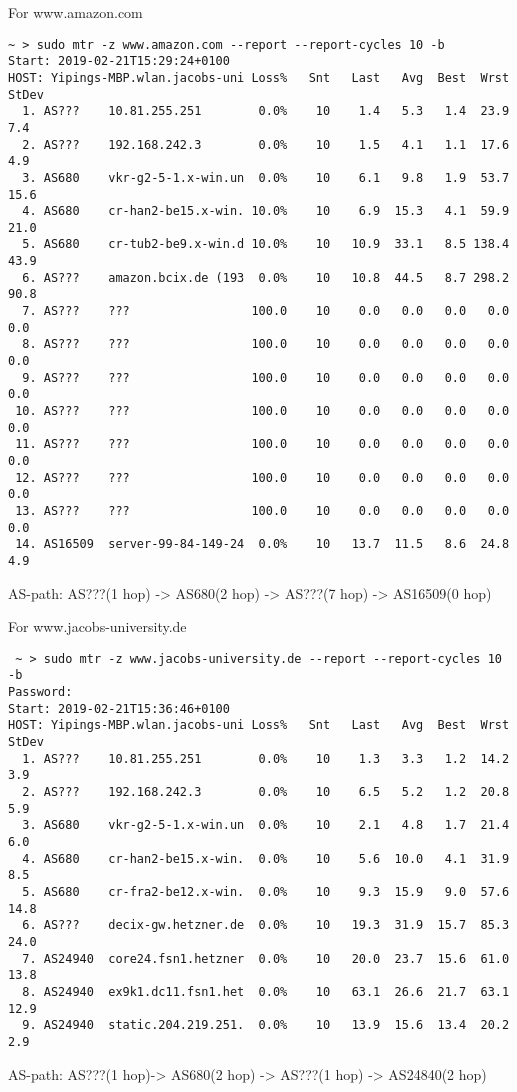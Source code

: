 \documentclass[11pt]{article}
\begin{document}
For www.amazon.com
\begin{verbatim}
~ > sudo mtr -z www.amazon.com --report --report-cycles 10 -b
Start: 2019-02-21T15:29:24+0100
HOST: Yipings-MBP.wlan.jacobs-uni Loss%   Snt   Last   Avg  Best  Wrst StDev
  1. AS???    10.81.255.251        0.0%    10    1.4   5.3   1.4  23.9   7.4
  2. AS???    192.168.242.3        0.0%    10    1.5   4.1   1.1  17.6   4.9
  3. AS680    vkr-g2-5-1.x-win.un  0.0%    10    6.1   9.8   1.9  53.7  15.6
  4. AS680    cr-han2-be15.x-win. 10.0%    10    6.9  15.3   4.1  59.9  21.0
  5. AS680    cr-tub2-be9.x-win.d 10.0%    10   10.9  33.1   8.5 138.4  43.9
  6. AS???    amazon.bcix.de (193  0.0%    10   10.8  44.5   8.7 298.2  90.8
  7. AS???    ???                 100.0    10    0.0   0.0   0.0   0.0   0.0
  8. AS???    ???                 100.0    10    0.0   0.0   0.0   0.0   0.0
  9. AS???    ???                 100.0    10    0.0   0.0   0.0   0.0   0.0
 10. AS???    ???                 100.0    10    0.0   0.0   0.0   0.0   0.0
 11. AS???    ???                 100.0    10    0.0   0.0   0.0   0.0   0.0
 12. AS???    ???                 100.0    10    0.0   0.0   0.0   0.0   0.0
 13. AS???    ???                 100.0    10    0.0   0.0   0.0   0.0   0.0
 14. AS16509  server-99-84-149-24  0.0%    10   13.7  11.5   8.6  24.8   4.9
\end{verbatim}
AS-path: AS???(1 hop) -> AS680(2 hop) -> AS???(7 hop) -> AS16509(0 hop)

For www.jacobs-university.de
\begin{verbatim}
 ~ > sudo mtr -z www.jacobs-university.de --report --report-cycles 10 -b
Password:
Start: 2019-02-21T15:36:46+0100
HOST: Yipings-MBP.wlan.jacobs-uni Loss%   Snt   Last   Avg  Best  Wrst StDev
  1. AS???    10.81.255.251        0.0%    10    1.3   3.3   1.2  14.2   3.9
  2. AS???    192.168.242.3        0.0%    10    6.5   5.2   1.2  20.8   5.9
  3. AS680    vkr-g2-5-1.x-win.un  0.0%    10    2.1   4.8   1.7  21.4   6.0
  4. AS680    cr-han2-be15.x-win.  0.0%    10    5.6  10.0   4.1  31.9   8.5
  5. AS680    cr-fra2-be12.x-win.  0.0%    10    9.3  15.9   9.0  57.6  14.8
  6. AS???    decix-gw.hetzner.de  0.0%    10   19.3  31.9  15.7  85.3  24.0
  7. AS24940  core24.fsn1.hetzner  0.0%    10   20.0  23.7  15.6  61.0  13.8
  8. AS24940  ex9k1.dc11.fsn1.het  0.0%    10   63.1  26.6  21.7  63.1  12.9
  9. AS24940  static.204.219.251.  0.0%    10   13.9  15.6  13.4  20.2   2.9
\end{verbatim}
AS-path: AS???(1 hop)-> AS680(2 hop) -> AS???(1 hop) -> AS24840(2 hop)
\end{document}
